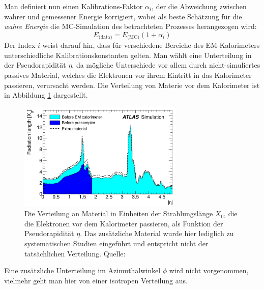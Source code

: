 Man definiert nun einen Kalibrations-Faktor $\alpha_i$, der die Abweichung
zwischen wahrer und gemessener Energie korrigiert, wobei als beste Schätzung für
die \textit{wahre Energie} die \acs{MC}-Simulation des betrachteten Prozesses
herangezogen wird:
\begin{equation}
    \label{definition:energy_scale}
    E_\text{(data)} = E_\text{(MC)} (1+\alpha_i)
\end{equation}
Der Index $i$ weist darauf hin, dass für verschiedene Bereiche des
EM-Kalorimeters unterschiedliche Kalibrationskonstanten gelten. Man wählt eine
Unterteilung in der Pseudorapidität $\eta$, da mögliche Unterschiede vor allem
durch nicht-simuliertes passives Material, welches die Elektronen vor ihrem 
Eintritt in das Kalorimeter passieren, verursacht werden. Die Verteilung von
Materie vor dem Kalorimeter ist in Abbildung
\ref{fig:extra_material} dargestellt.

\begin{figure}
    \centering
    \includegraphics[width=0.7\textwidth]{img/extra_material}
    \caption[Material vor dem EM-Kalorimeter]
        {Die Verteilung an Material in Einheiten der Strahlungslänge $X_0$, die
        die Elektronen vor dem Kalorimeter passieren, als Funktion der 
        Pseudorapidität $\eta$. Das zusätzliche Material wurde hier lediglich 
        zu systematischen Studien eingeführt und entspricht nicht der 
        tatsächlichen Verteilung. Quelle: \cite{Aad:2011mk}}
    \label{fig:extra_material}
\end{figure}

Eine zusätzliche Unterteilung im Azimuthalwinkel $\phi$ wird nicht
vorgenommen, vielmehr geht man hier von einer isotropen Verteilung aus.
\newline

